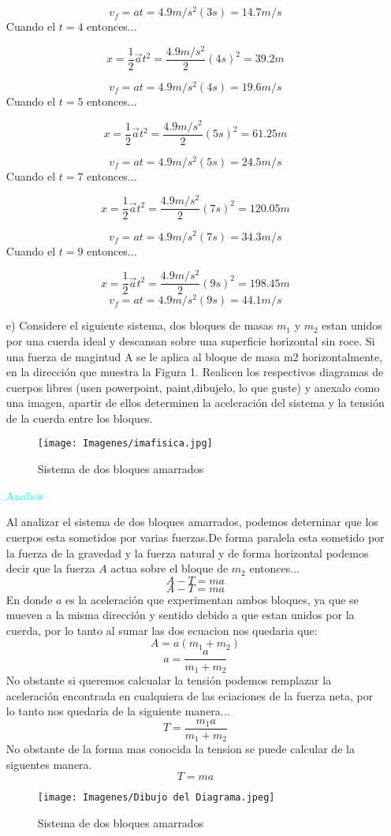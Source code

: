 \documentclass[letterpaper,12pt]{article}
\begin{document}
\begin{enumerate}
$$v_f=at=4.9m/s^{2}(3s)=14.7m/s$$
Cuando el $t=4$ entonces...

$${x}=\frac{1}{2}\Vec{a}t^{2}=\frac{4.9m/s^{2}}{2}(4s)^{2}=39.2m$$

$$v_f=at=4.9m/s^{2}(4s)=19.6m/s$$
Cuando el $t=5$ entonces...

$${x}=\frac{1}{2}\Vec{a}t^{2}=\frac{4.9m/s^{2}}{2}(5s)^{2}=61.25m$$

$$v_f=at=4.9m/s^{2}(5s)=24.5m/s$$
Cuando el $t=7$ entonces...

$${x}=\frac{1}{2}\Vec{a}t^{2}=\frac{4.9m/s^{2}}{2}(7s)^{2}=120.05m$$

$$v_f=at=4.9m/s^{2}(7s)=34.3m/s$$
Cuando el $t=9$ entonces...

$${x}=\frac{1}{2}\Vec{a}t^{2}=\frac{4.9m/s^{2}}{2}(9s)^{2}=198.45m$$
$$v_f=at=4.9m/s^{2}(9s)=44.1m/s$$
\item[e)]Considere el siguiente sistema, dos bloques de masas $m_1$ y $m_2$ estan unidos por
una cuerda ideal y descansan sobre una superficie horizontal sin roce. Si una fuerza
de magintud A se le aplica al bloque de masa m2 horizontalmente, en la dirección
que muestra la Figura 1. Realicen los respectivos diagramas de cuerpos libres (usen powerpoint, paint,dibujelo, lo que guste) y anexalo como una imagen, apartir de ellos determinen la aceleración del sistema y la tensión de la cuerda entre los bloques.
\begin{figure}[ht]
    \centering
    \texttt{[image: Imagenes/imafisica.jpg]}
    \caption{Sistema de dos bloques amarrados}
    \label{fig:my_label}
\end{figure}

{\textcolor{cyan}{Analisis}}

Al analizar el sistema de dos bloques amarrados, podemos deterninar que los cuerpos esta sometidos por varias fuerzas.De forma paralela esta sometido por la fuerza de la gravedad y la fuerza natural y de forma horizontal podemos decir que la fuerza $A$ actua sobre el bloque de $m_2$ entonces...
$$A-T=ma$$
$$A-T=ma$$
En donde $a$ es la aceleración que experimentan ambos bloques, ya que se mueven a la misma dirección y sentido debido a que estan unidos por la cuerda, por lo tanto al sumar las dos ecuacion nos quedaria que: 
$$A=a(m_1+m_2)$$
$$a=\frac{a}{m_1+m_2}$$
No obstante si queremos calcualar la tensión podemos remplazar la aceleración encontrada en cualquiera de las eciaciones de la fuerza neta, por lo tanto nos quedaria de la siguiente manera...
$$T=\frac{m_1a}{m_1+m_2}$$
No obstante de la forma mas conocida la tension se puede calcular de la siguentes manera.
$$T=ma$$
\begin{figure}[th]
    \centering
    \texttt{[image: Imagenes/Dibujo del Diagrama.jpeg]}
    \caption{Sistema de dos bloques amarrados}
    \label{fig:my_label}
\end{figure}
\end{enumerate}
\end{document}
